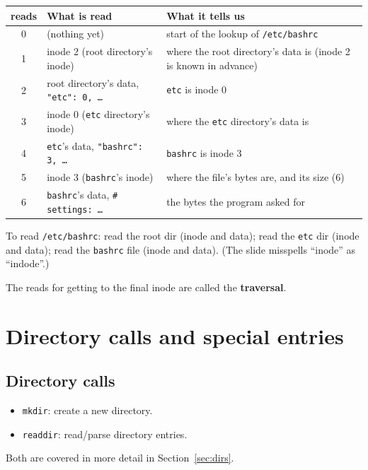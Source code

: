 \documentclass[11pt,a4paper]{article}
\begin{document}
\begin{center}
\small
\renewcommand{\arraystretch}{1.2}
\begin{tabularx}{\textwidth}{@{}clX@{}}
  \toprule
  \textbf{reads} & \textbf{What is read} & \textbf{What it tells us} \\
  \midrule
  0 & (nothing yet) & start of the lookup of \texttt{/etc/bashrc} \\
  1 & inode 2 (root directory's inode) & where the root directory's data is
      (inode 2 is known in advance) \\
  2 & root directory's data, \texttt{"etc": 0, \ldots} & \texttt{etc} is
      inode 0 \\
  3 & inode 0 (\texttt{etc} directory's inode) & where the \texttt{etc}
      directory's data is \\
  4 & \texttt{etc}'s data, \texttt{"bashrc": 3, \ldots} & \texttt{bashrc} is
      inode 3 \\
  5 & inode 3 (\texttt{bashrc}'s inode) & where the file's bytes are, and its
      size (6) \\
  6 & \texttt{bashrc}'s data, \texttt{\# settings: \ldots} & the bytes the
      program asked for \\
  \bottomrule
\end{tabularx}
\end{center}

\begin{keybox}[Traversal]
To read \texttt{/etc/bashrc}: read the root dir (inode and data); read the
\texttt{etc} dir (inode and data); read the \texttt{bashrc} file (inode and
data). {\small (The slide misspells ``inode'' as ``indode''.)}

The reads for getting to the final inode are called the \textbf{traversal}.
\end{keybox}

\section{Directory calls and special entries}

\subsection{Directory calls}

\begin{itemize}
  \item \texttt{mkdir}: create a new directory.
  \item \texttt{readdir}: read/parse directory entries.
\end{itemize}
Both are covered in more detail in Section~\ref{sec:dirs}.
\end{document}
